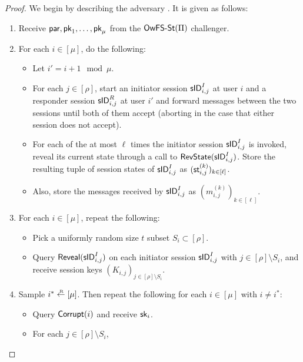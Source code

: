 \begin{proof}
  We begin by describing the adversary \advA. It is given as follows:
  \begin{enumerate}[itemsep=0.1cm]
    \item Receive \(\mathsf{par}, \mathsf{pk}_{1}, \ldots, \mathsf{pk}_{\mu}\) from the \(\mathsf{OwFS}\text{-}\mathsf{St}(\mathrm{\Pi})\) challenger.
    \item For each \(i \in [\mu]\), do the following:
      \begin{itemize}[label={\textbullet},itemsep=0.1cm]
        \item Let \(i' = i + 1 \mod{\mu}.\)
        \item For each \(j \in [\rho]\), start an initiator session \(\mathsf{sID}_{i,j}^{I}\) at user \(i\)
              and a responder session \(\mathsf{sID}_{i,j}^{R}\) at user \(i'\)
              and forward messages between the two sessions until both of them accept
              (aborting in the case that either session does not accept).
        \item For each of the at most \(\ell\) times the initiator session \(\mathsf{sID}_{i,j}^{I}\) is invoked,
              reveal its current state through a call to \(\mathsf{RevState}(\mathsf{sID}_{i,j}^{I})\).
              Store the resulting tuple of session states of \(\mathsf{sID}_{i,j}^{I}\) as \((\mathsf{st}_{i,j}^{(k)})_{k \in [\ell]}\).
        \item Also, store the messages received by \(\mathsf{sID}_{i,j}^{I}\) as \((m_{i,j}^{(k)})_{k \in [\ell]}\).
      \end{itemize}
    \item For each \(i \in [\mu]\), repeat the following:
          \begin{itemize}[label={\textbullet},itemsep=0.1cm]
            \item Pick a uniformly random size \(t\) subset \(S_{i} \subset [\rho]\).
            \item Query \(\mathsf{Reveal}(\mathsf{sID}_{i,j}^{I})\) on each initiator session \(\mathsf{sID}_{i,j}^{I}\)
                  with \(j \in [\rho] \setminus S_{i}\),
                  and receive session keys \((K_{i,j})_{j \in [\rho] \setminus S_{i}}\).
          \end{itemize}
    \item\label{owfsst:advA:corrupt} Sample \(i^{*} \sampleR [\mu]\). Then repeat the following for each \(i \in [\mu]\) with \(i \ne i^{*}\):
          \begin{itemize}[label={\textbullet},itemsep=0.1cm]
            \item Query \(\mathsf{Corrupt}(i)\) and receive \(\mathsf{sk}_{i}\).
            \item For each \(j \in [\rho] \setminus S_{i}\),

\end{itemize}
\end{enumerate}
\end{proof}
